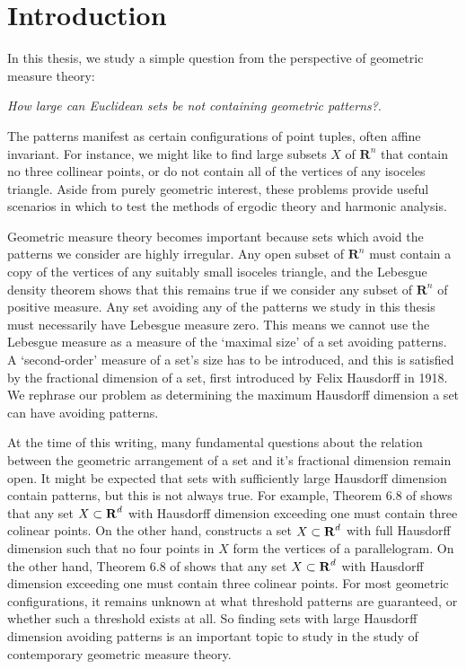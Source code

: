 
\chapter{Introduction}
\label{ch:Introduction}

In this thesis, we study a simple question from the perspective of geometric measure theory:
%
\begin{center}
	{\it How large can Euclidean sets be not containing geometric patterns?}.
\end{center}
%
The patterns manifest as certain configurations of point tuples, often affine invariant. For instance, we might like to find large subsets $X$ of $\mathbf{R}^n$ that contain no three collinear points, or do not contain all of the vertices of any isoceles triangle. Aside from purely geometric interest, these problems provide useful scenarios in which to test the methods of ergodic theory and harmonic analysis.

Geometric measure theory becomes important because sets which avoid the patterns we consider are highly irregular. Any open subset of $\mathbf{R}^n$ must contain a copy of the vertices of any suitably small isoceles triangle, and the Lebesgue density theorem shows that this remains true if we consider any subset of $\mathbf{R}^n$ of positive measure. Any set avoiding any of the patterns we study in this thesis must necessarily have Lebesgue measure zero. This means we cannot use the Lebesgue measure as a measure of the `maximal size' of a set avoiding patterns. A `second-order' measure of a set's size has to be introduced, and this is satisfied by the fractional dimension of a set, first introduced by Felix Hausdorff in 1918. We rephrase our problem as determining the maximum Hausdorff dimension a set can have avoiding patterns.

At the time of this writing, many fundamental questions about the relation between the geometric arrangement of a set and it's fractional dimension remain open. It might be expected that sets with sufficiently large Hausdorff dimension contain patterns, but this is not always true. For example, Theorem 6.8 of \cite{Matilla} shows that any set $X \subset \operatorname{\mathbf{R}}^d$ with Hausdorff dimension exceeding one must contain three colinear points. On the other hand, \cite{Maga} constructs a set $X \subset \operatorname{\mathbf{R}}^d$ with full Hausdorff dimension such that no four points in $X$ form the vertices of a parallelogram. On the other hand, Theorem 6.8 of \cite{Matilla} shows that any set $X \subset \operatorname{\mathbf{R}}^d$ with Hausdorff dimension exceeding one must contain three colinear points. For most geometric configurations, it remains unknown at what threshold patterns are guaranteed, or whether such a threshold exists at all. So finding sets with large Hausdorff dimension avoiding patterns is an important topic to study in the study of contemporary geometric measure theory.

